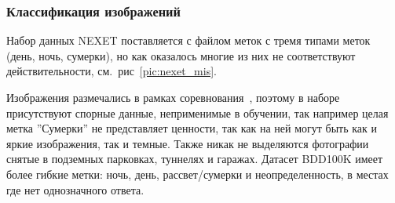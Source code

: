 \documentclass[11pt,a4paper]{extarticle}
\begin{document}
{		\subsubsection*{Классификация изображений}\label{sec:classify_images}

			Набор данных NEXET поставляется с файлом меток  с тремя типами меток (день, ночь, сумерки), но как оказалось многие из них не соответствуют действительности, см.~рис~\ref{pic:nexet_mis}.
			
			\noindent
			Изображения размечались в рамках соревнования~\cite{data:nexet}, поэтому в наборе присутствуют спорные данные, неприменимые в обучении, так например целая метка ''Сумерки'' не представляет ценности, так как на ней могут быть как и яркие изображения, так и темные.
			Также никак не выделяются фотографии снятые в подземных парковках, туннелях и гаражах.
			Датасет BDD100K имеет более гибкие метки: ночь, день, рассвет/сумерки и неопределенность, в местах где нет однозначного ответа.

}
\end{document}

